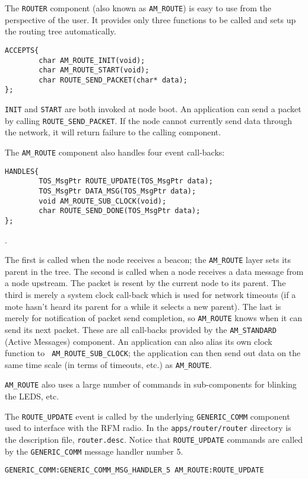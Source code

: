 \documentclass[12pt]{article}
\begin{document}
The {\tt ROUTER} component (also known as {\tt AM\_ROUTE})
 is easy to use from the perspective of the user.
It provides only three functions to be called and sets up the routing tree
automatically.

\begin{verbatim}
ACCEPTS{
        char AM_ROUTE_INIT(void);
        char AM_ROUTE_START(void);
        char ROUTE_SEND_PACKET(char* data);
};
\end{verbatim}

{\tt INIT} and {\tt START} are both invoked at node boot. An
application can send a packet by calling {\tt ROUTE\_SEND\_PACKET}.
If the node cannot currently send data through the network, it
will return failure to the calling component.

The {\tt AM\_ROUTE} component also handles four event call-backs:

\begin{verbatim}
HANDLES{
        TOS_MsgPtr ROUTE_UPDATE(TOS_MsgPtr data);
        TOS_MsgPtr DATA_MSG(TOS_MsgPtr data);
        void AM_ROUTE_SUB_CLOCK(void);
        char ROUTE_SEND_DONE(TOS_MsgPtr data);
};
\end{verbatim}.

The first is called when the node receives a beacon; the {\tt AM\_ROUTE}
layer sets its parent in the tree. The second is called when a node
receives a data message from a node upstream.  The packet is resent
by the current node to its parent. The third is
merely a system clock call-back which is used for network timeouts (if
a mote hasn't heard its parent for a while it selects a new
parent). The last is merely for notification of packet send
completion, so {\tt AM\_ROUTE} knows when it can send its next packet. These are
all call-backs provided by the {\tt AM\_STANDARD} (Active Messages) component. An
application can also alias its own clock function to {\tt
AM\_ROUTE\_SUB\_CLOCK}; the application can then send out data on the same
time scale (in terms of timeouts, etc.) as {\tt AM\_ROUTE}.

{\tt AM\_ROUTE} also uses a large number of commands in sub-components for
blinking the LEDS, etc.

The {\tt ROUTE\_UPDATE} event is called by the underlying {\tt GENERIC\_COMM}
component used to interface with the RFM radio.  In the 
{\tt apps/router/router} directory is the description file, 
{\tt router.desc}.  Notice that {\tt ROUTE\_UPDATE} commands are
called by the {\tt GENERIC\_COMM} message handler number 5.

\begin{verbatim}
GENERIC_COMM:GENERIC_COMM_MSG_HANDLER_5 AM_ROUTE:ROUTE_UPDATE
\end{verbatim}
\end{document}
